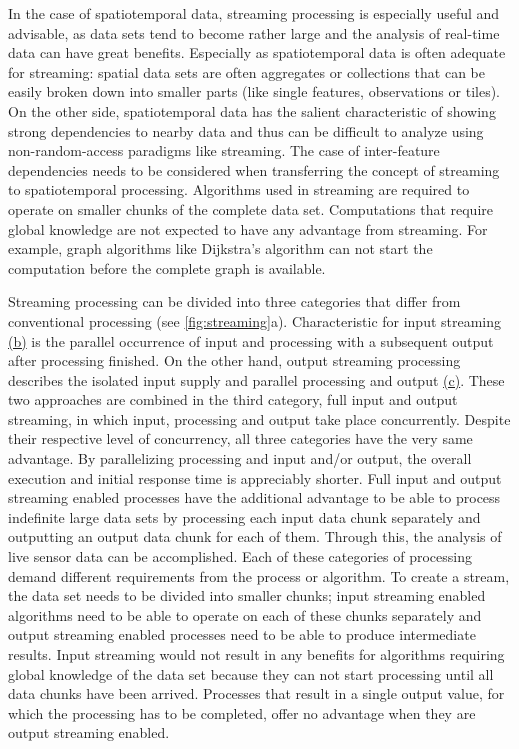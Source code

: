   In the case of spatiotemporal data, streaming processing is especially useful and advisable, as data sets tend to become rather large and the analysis of real-time data can have great benefits. Especially as spatiotemporal data is often adequate for streaming: spatial data sets are often aggregates or collections that can be easily broken down into smaller parts (like single features, observations or tiles). On the other side, spatiotemporal data has the salient characteristic of showing strong dependencies to nearby data and thus can be difficult to analyze using non-random-access paradigms like streaming. The case of inter-feature dependencies needs to be considered when transferring the concept of streaming to spatiotemporal processing. Algorithms used in streaming are required to operate on smaller chunks of the complete data set. Computations that require global knowledge are not expected to have any advantage from streaming. For example, graph algorithms like Dijkstra's algorithm \citep{dijkstra} can not start the computation before the complete graph is available.

  Streaming processing can be divided into three categories that differ from conventional processing (see \cref{fig:streaming}a). Characteristic for input streaming \hyperref[fig:streaming]{(b)} is the parallel occurrence of input and processing with a subsequent output after processing finished. On the other hand, output streaming processing describes the isolated input supply and parallel processing and output \hyperref[fig:streaming]{(c)}. These two approaches are combined in the third category, full input and output streaming, in which input, processing and output take place concurrently. Despite their respective level of concurrency, all three categories have the very same advantage. By parallelizing processing and input and/or output, the overall execution and initial response time is appreciably shorter. Full input and output streaming enabled processes have the additional advantage to be able to process indefinite large data sets by processing each input data chunk separately and outputting an output data chunk for each of them. Through this, the analysis of live sensor data can be accomplished. Each of these categories of processing demand different requirements from the process or algorithm. To create a stream, the data set needs to be divided into smaller chunks; input streaming enabled algorithms need to be able to operate on each of these chunks separately and output streaming enabled processes need to be able to produce intermediate results. Input streaming would not result in any benefits for algorithms requiring global knowledge of the data set because they can not start processing until all data chunks have been arrived. Processes that result in a single output value, for which the processing has to be completed, offer no advantage when they are output streaming enabled.

